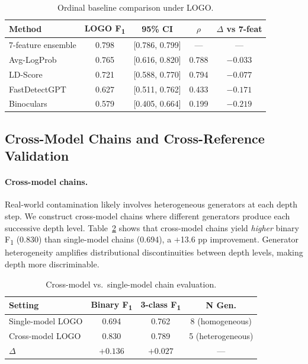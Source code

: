 \documentclass[11pt,a4paper]{article}
\newcommand{\fone}{F\textsubscript{1}}
\newcommand{\rhosp}{\rho}
\begin{document}
\begin{table}[t]
\centering
\caption{Ordinal baseline comparison under LOGO.}
\label{tab:baseline}
\begin{tabular}{lcccc}
\toprule
\textbf{Method} & \textbf{LOGO \fone{}} & \textbf{95\% CI} & $\rhosp$ & \textbf{$\Delta$ vs 7-feat} \\
\midrule
7-feature ensemble & 0.798 & {[0.786, 0.799]} & --- & --- \\
Avg-LogProb & 0.765 & {[0.616, 0.820]} & 0.788 & $-0.033$ \\
LD-Score & 0.721 & {[0.588, 0.770]} & 0.794 & $-0.077$ \\
FastDetectGPT & 0.627 & {[0.511, 0.762]} & 0.433 & $-0.171$ \\
Binoculars & 0.579 & {[0.405, 0.664]} & 0.199 & $-0.219$ \\
\bottomrule
\end{tabular}
\end{table}

\subsection{Cross-Model Chains and Cross-Reference Validation}
\label{sec:cross}

\paragraph{Cross-model chains.}
Real-world contamination likely involves heterogeneous generators at each depth step.
We construct cross-model chains where different generators produce each successive depth level.
Table~\ref{tab:crossmodel} shows that cross-model chains yield \emph{higher} binary \fone{} (0.830) than single-model chains (0.694),
a $+$13.6 pp improvement.
Generator heterogeneity amplifies distributional discontinuities between depth levels, making depth more discriminable.

\begin{table}[t]
\centering
\caption{Cross-model vs.\ single-model chain evaluation.}
\label{tab:crossmodel}
\begin{tabular}{lccc}
\toprule
\textbf{Setting} & \textbf{Binary \fone{}} & \textbf{3-class \fone{}} & \textbf{N Gen.} \\
\midrule
Single-model LOGO & 0.694 & 0.762 & 8 (homogeneous) \\
Cross-model LOGO & 0.830 & 0.789 & 5 (heterogeneous) \\
\midrule
$\Delta$ & $+0.136$ & $+0.027$ & --- \\
\bottomrule
\end{tabular}
\end{table}
\end{document}
